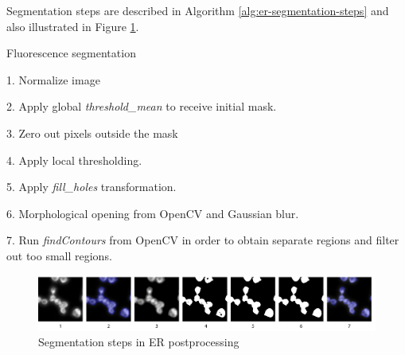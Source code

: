 Segmentation steps are described in Algorithm \ref{alg:er-segmentation-steps} and also illustrated in Figure \ref{fig:er-segmentation-steps}.

\begin{algorithm}
    \caption{Fluorescence segmentation}
    \begin{algorithmic}
    \item 1. Normalize image
    \item 2. Apply global \textit{threshold\_mean} to receive initial mask.
    \item 3. Zero out pixels outside the mask
    \item 4. Apply local thresholding.  
    \item 5. Apply \textit{fill\_holes} transformation.
    \item 6. Morphological opening from OpenCV and Gaussian blur.
    \item 7. Run \textit{findContours} from OpenCV in order to obtain separate regions and filter out too small regions.
    \end{algorithmic}
    \label{alg:er-segmentation-steps}
\end{algorithm}    

\begin{figure}[htb]
    \begin{center}
        \includegraphics[width=0.3\linewidth]{bilder/ER/segmentation/segmentation.png}
        \caption{Segmentation steps in ER postprocessing}\label{fig:er-segmentation-steps}
    \end{center}
\end{figure}